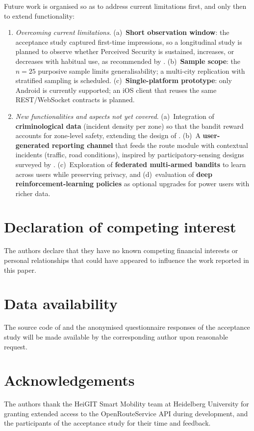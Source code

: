 \documentclass[a4paper,fleqn]{cas-sc}
\begin{document}
	Future work is organised so as to address current limitations first, and only then to extend functionality:
	
	\begin{enumerate}
		\item \emph{Overcoming current limitations}. (a)~\textbf{Short observation window}: the acceptance study captured first-time impressions, so a longitudinal study is planned to observe whether Perceived Security is sustained, increases, or decreases with habitual use, as recommended by \citet{cagney2025urban}. (b)~\textbf{Sample scope}: the $n=25$ purposive sample limits generalisability; a multi-city replication with stratified sampling is scheduled. (c)~\textbf{Single-platform prototype}: only Android is currently supported; an iOS client that reuses the same REST/WebSocket contracts is planned.
		\item \emph{New functionalities and aspects not yet covered}. (a)~Integration of \textbf{criminological data} (incident density per zone) so that the bandit reward accounts for zone-level safety, extending the design of \citet{kim2025crimesafetymap}. (b)~A \textbf{user-generated reporting channel} that feeds the route module with contextual incidents (traffic, road conditions), inspired by participatory-sensing designs surveyed by \citet{paiva2021smartmobility}. (c)~Exploration of \textbf{federated multi-armed bandits} \citep{shi2021fedmab} to learn across users while preserving privacy, and (d)~evaluation of \textbf{deep reinforcement-learning policies} \citep{zhang2025drlnavigation} as optional upgrades for power users with richer data.
	\end{enumerate}
	
	\printcredits
	
	\section*{Declaration of competing interest}
	The authors declare that they have no known competing financial interests or personal relationships that could have appeared to influence the work reported in this paper.
	
	\section*{Data availability}
	The source code of \RUTAI{} and the anonymised questionnaire responses of the acceptance study will be made available by the corresponding author upon reasonable request.
	
	\section*{Acknowledgements}
	The authors thank the HeiGIT Smart Mobility team at Heidelberg University for granting extended access to the OpenRouteService API during development, and the participants of the acceptance study for their time and feedback.
	
	
	
	
\end{document}
